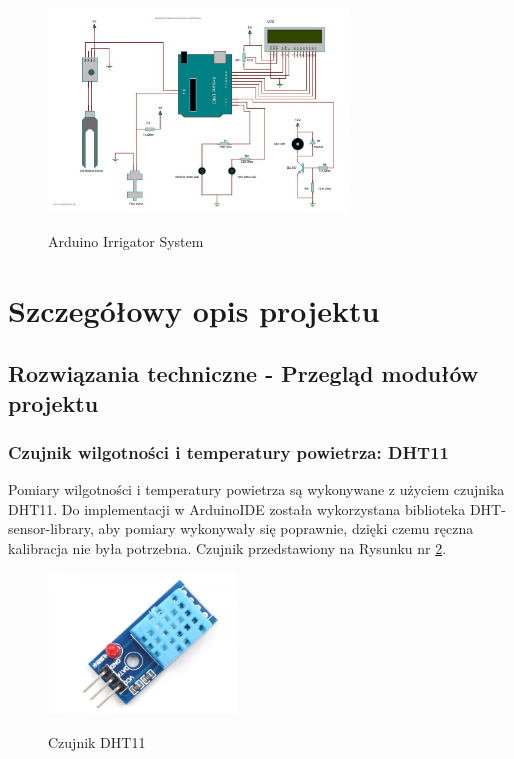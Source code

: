 \documentclass[12pt]{article}
\begin{document}
\begin{figure}[!h]
	\begin{center}
		{\includegraphics[width=8cm]{arduino_przyklad2.jpg}}
	\end{center}
	\caption{Arduino Irrigator System ~\cite{ArduinoIS}}
	\label{fig:ArduinoIS}
\end{figure}

\section{Szczegółowy opis projektu}


\subsection{Rozwiązania techniczne - Przegląd modułów projektu}
\subsubsection{Czujnik wilgotności i temperatury powietrza: DHT11}
Pomiary wilgotności i temperatury powietrza są wykonywane z użyciem czujnika DHT11. Do implementacji w ArduinoIDE została wykorzystana biblioteka DHT-sensor-library, aby pomiary wykonywały się poprawnie, dzięki czemu ręczna kalibracja nie była potrzebna. Czujnik przedstawiony na Rysunku nr \ref{fig:dht11}.
\begin{figure}[!h]
	\begin{center}
		{\includegraphics[width=5cm]{DHT11_photo.png}}
	\end{center}
	\caption{Czujnik DHT11}
	\label{fig:dht11}
\end{figure}
\end{document}

